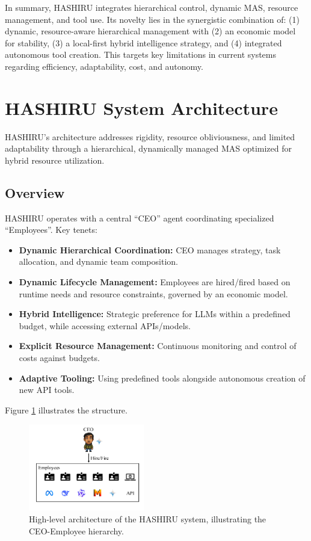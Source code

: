 \documentclass[conference]{IEEEtran}
\begin{document}
In summary, HASHIRU integrates hierarchical control, dynamic MAS, resource management, and tool use. Its novelty lies in the synergistic combination of: (1) dynamic, resource-aware hierarchical management with (2) an economic model for stability, (3) a local-first hybrid intelligence strategy, and (4) integrated autonomous tool creation. This targets key limitations in current systems regarding efficiency, adaptability, cost, and autonomy.

\section{HASHIRU System Architecture}
\label{sec:architecture}

HASHIRU's architecture addresses rigidity, resource obliviousness, and limited adaptability through a hierarchical, dynamically managed MAS optimized for hybrid resource utilization.

\subsection{Overview}
HASHIRU operates with a central ``CEO'' agent coordinating specialized ``Employees''. Key tenets:
\begin{itemize}
    \item \textbf{Dynamic Hierarchical Coordination:} CEO manages strategy, task allocation, and dynamic team composition.
    \item \textbf{Dynamic Lifecycle Management:} Employees are hired/fired based on runtime needs and resource constraints, governed by an economic model.
    \item \textbf{Hybrid Intelligence:} Strategic preference for LLMs within a predefined budget, while accessing external APIs/models.
    \item \textbf{Explicit Resource Management:} Continuous monitoring and control of costs against budgets.
    \item \textbf{Adaptive Tooling:} Using predefined tools alongside autonomous creation of new API tools.
\end{itemize}
Figure \ref{fig:arch} illustrates the structure.

\begin{figure}[ht]
    \centering
    \includegraphics[width=0.45\textwidth]{HASHIRU.pdf}
    \caption{High-level architecture of the HASHIRU system, illustrating the CEO-Employee hierarchy.}
    \label{fig:arch}
\end{figure}
\end{document}
